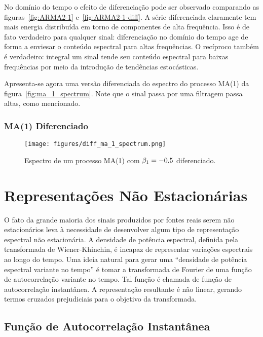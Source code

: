 No domínio do tempo o efeito de diferenciação pode ser observado comparando as
figuras~\ref{fig:ARMA2-1} e~\ref{fig:ARMA2-1-diff}. A série diferenciada
claramente tem mais energia distribuída em torno de componentes de alta
frequência. Isso é de fato verdadeiro para qualquer sinal: diferenciação
no domínio do tempo age de forma a enviesar o conteúdo espectral para altas
frequências. O recíproco também é verdadeiro: integral um sinal tende seu
conteúdo espectral para baixas frequências por meio da introdução de tendências
estocásticas.

Apresenta-se agora uma versão diferenciada do espectro do processo MA(1) da
figura~\ref{fig:ma_1_spectrum}. Note que o sinal passa por uma filtragem
passa altas, como mencionado.

\subsubsection{MA(1) Diferenciado}

\begin{figure}[H]
    \centering
    \texttt{[image: figures/diff\_ma\_1\_spectrum.png]}
    \caption{Espectro de um processo MA(1) com $\protect \beta_1 = -0.5$
    diferenciado.}
    \label{fig:diff_ma_1_spectrum}
\end{figure}

\section{Representações Não Estacionárias}

O fato da grande maioria dos sinais produzidos por fontes reais serem não
estacionários leva à necessidade de desenvolver algum tipo de representação
espectral não estacionária. A densidade de potência espectral, definida pela
transformada de Wiener-Khinchin, é incapaz de representar variações espectrais
ao longo do tempo. Uma ideia natural para gerar uma ``densidade de potência
espectral variante no tempo'' é tomar a transformada de Fourier de uma função
de autocorrelação variante no tempo. Tal função é chamada de função de
autocorrelação instantânea. A representação resultante é não linear, gerando
termos cruzados prejudiciais para o objetivo da transformada.

\subsection{Função de Autocorrelação Instantânea}

